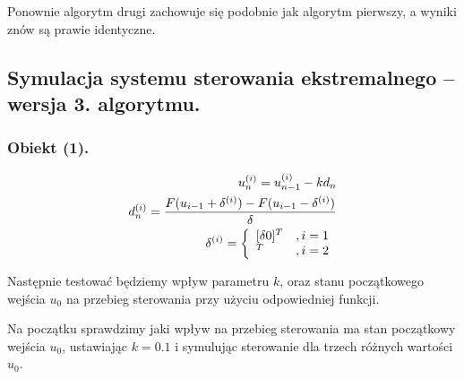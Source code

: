 \documentclass[a4paper,10pt]{article}
\begin{document}
Ponownie algorytm drugi zachowuje się podobnie jak algorytm pierwszy, a wyniki znów są prawie identyczne.



\newpage
\subsection{Symulacja systemu sterowania ekstremalnego – wersja 3. algorytmu.}


\subsubsection{Obiekt (1).}
\begin{eqnarray}
	u_n^{(i)} = u_{n-1}^{(i)}-kd_n\\
	d_n^{(i)} = {{F(u_{i-1}+\delta^{(i)})-F(u_{i-1}-\delta^{(i)})}\over {\delta}} \\
	\delta^{(i)}=\left\{ \begin{array}{ll} 	[\delta  0]^{T} & , i=1 \\
											[0  \delta]^{T} & , i=2 
						\end{array}  
				 \right.
\end{eqnarray}

Następnie testować będziemy wpływ parametru $k$, oraz stanu początkowego wejścia $u_0$ na przebieg sterowania przy użyciu odpowiedniej funkcji.


\newpage Na początku sprawdzimy jaki wpływ na przebieg sterowania ma stan początkowy wejścia $u_0$, ustawiając $k=0.1$ i symulując sterowanie dla trzech różnych wartości $u_0$.
\end{document}
